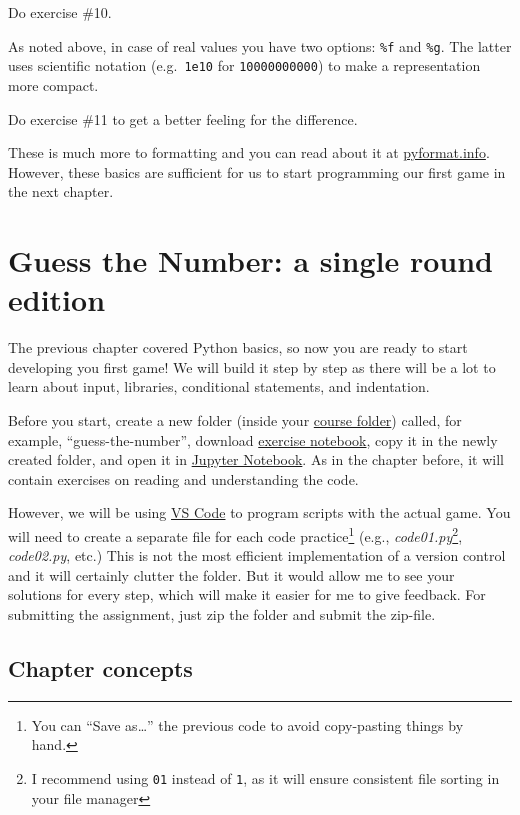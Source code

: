 \documentclass[
]{book}
\begin{document}
Do exercise \#10.

As noted above, in case of real values you have two options: \texttt{\%f} and \texttt{\%g}. The latter uses scientific notation (e.g.~\texttt{1e10} for \texttt{10000000000}) to make a representation more compact.

Do exercise \#11 to get a better feeling for the difference.

These is much more to formatting and you can read about it at \href{https://pyformat.info/}{pyformat.info}. However, these basics are sufficient for us to start programming our first game in the next chapter.

\hypertarget{guess-the-number-single-round}{%
\chapter{Guess the Number: a single round edition}\label{guess-the-number-single-round}}

The previous chapter covered Python basics, so now you are ready to start developing you first game! We will build it step by step as there will be a lot to learn about input, libraries, conditional statements, and indentation.

Before you start, create a new folder (inside your \protect\hyperlink{files-folder}{course folder}) called, for example, ``guess-the-number'', download \href{notebooks/Guess\%20the\%20number\%20-\%20single\%20round.ipynb}{exercise notebook}, copy it in the newly created folder, and open it in \protect\hyperlink{jupyter-notebooks}{Jupyter Notebook}. As in the chapter before, it will contain exercises on reading and understanding the code.

However, we will be using \protect\hyperlink{install-vs-code}{VS Code} to program scripts with the actual game. You will need to create a separate file for each code practice\footnote{You can ``Save as\ldots{}'' the previous code to avoid copy-pasting things by hand.} (e.g., \emph{code01.py}\footnote{I recommend using \texttt{01} instead of \texttt{1}, as it will ensure consistent file sorting in your file manager}, \emph{code02.py}, etc.) This is not the most efficient implementation of a version control and it will certainly clutter the folder. But it would allow me to see your solutions for every step, which will make it easier for me to give feedback. For submitting the assignment, just zip the folder and submit the zip-file.

\hypertarget{chapter-concepts-1}{%
\section{Chapter concepts}\label{chapter-concepts-1}}
\end{document}
